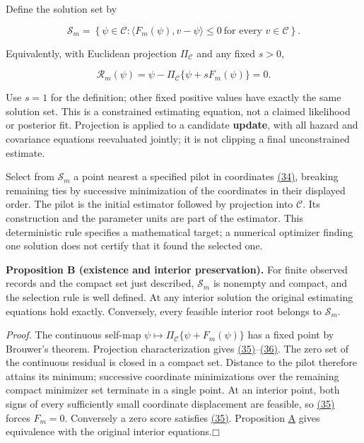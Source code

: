 \documentclass[11pt]{article}
\providecommand{\square}{\mdlgwhtsquare}
\begin{document}
Define the solution set by

\begin{equation*}
\mathcal S_m=\left\{\psi\in\mathcal C:
 \langle F_m(\psi),v-\psi\rangle\leq0
 \ \text{for every }v\in\mathcal C\right\}.
\tag{35}\label{eq:35}
\end{equation*}

Equivalently, with Euclidean projection \(\Pi_{\mathcal C}\) and any fixed \(s>0\),

\begin{equation*}
\mathcal R_m(\psi)=\psi-\Pi_{\mathcal C}\{\psi+s F_m(\psi)\}=0.
\tag{36}\label{eq:36}
\end{equation*}

Use \(s=1\) for the definition; other fixed positive values have exactly the same solution set. This is a constrained estimating equation, not a claimed likelihood or posterior fit. Projection is applied to a candidate \textbf{update}, with all hazard and covariance equations reevaluated jointly; it is not clipping a final unconstrained estimate.

Select from \(\mathcal S_m\) a point nearest a specified pilot in coordinates \hyperref[eq:34]{(34)}, breaking remaining ties by successive minimization of the coordinates in their displayed order. The pilot is the initial estimator followed by projection into \(\mathcal C\). Its construction and the parameter units are part of the estimator. This deterministic rule specifies a mathematical target; a numerical optimizer finding one solution does not certify that it found the selected one.

\label{res:Proposition-B}
\textbf{Proposition B (existence and interior preservation).} For finite observed records and the compact set just described, \(\mathcal S_m\) is nonempty and compact, and the selection rule is well defined. At any interior solution the original estimating equations hold exactly. Conversely, every feasible interior root belongs to \(\mathcal S_m\).

\emph{Proof.} The continuous self-map \(\psi\mapsto\Pi_{\mathcal C}\{\psi+F_m(\psi)\}\) has a fixed point by Brouwer's theorem. Projection characterization gives \hyperref[eq:35]{(35)}--\hyperref[eq:36]{(36)}. The zero set of the continuous residual is closed in a compact set. Distance to the pilot therefore attains its minimum; successive coordinate minimizations over the remaining compact minimizer set terminate in a single point. At an interior point, both signs of every sufficiently small coordinate displacement are feasible, so \hyperref[eq:35]{(35)} forces \(F_m=0\). Conversely a zero score satisfies \hyperref[eq:35]{(35)}. Proposition \hyperref[res:Proposition-A]{A} gives equivalence with the original interior equations.\hfill$\square$
\end{document}
